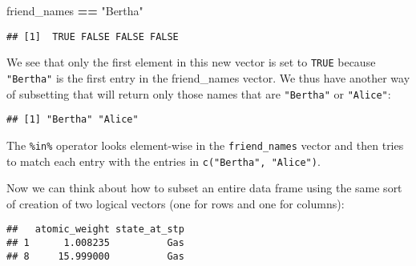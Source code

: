\documentclass[]{tufte-book}
\newenvironment{Shaded}{\begin{snugshade}}{\end{snugshade}}
\newcommand{\KeywordTok}[1]{\textcolor[rgb]{0.13,0.29,0.53}{\textbf{#1}}}
\newcommand{\NormalTok}[1]{#1}
\newcommand{\OperatorTok}[1]{\textcolor[rgb]{0.81,0.36,0.00}{\textbf{#1}}}
\newcommand{\StringTok}[1]{\textcolor[rgb]{0.31,0.60,0.02}{#1}}
\begin{document}
\begin{Shaded}
\begin{Highlighting}[]
\NormalTok{friend_names }\OperatorTok{==}\StringTok{ "Bertha"}
\end{Highlighting}
\end{Shaded}

\begin{verbatim}
## [1]  TRUE FALSE FALSE FALSE
\end{verbatim}

We see that only the first element in this new vector is set to \texttt{TRUE} because \texttt{"Bertha"} is the first entry in the friend\_names vector. We thus have another way of subsetting that will return only those names that are \texttt{"Bertha"} or \texttt{"Alice"}:

\begin{Shaded}
\end{Shaded}

\begin{verbatim}
## [1] "Bertha" "Alice"
\end{verbatim}

The \texttt{\%in\%} operator looks element-wise in the \texttt{friend\_names} vector and then tries to match each entry with the entries in \texttt{c("Bertha",\ "Alice")}.

Now we can think about how to subset an entire data frame using the same sort of creation of two logical vectors (one for rows and one for columns):

\begin{Shaded}
\end{Shaded}

\begin{verbatim}
##   atomic_weight state_at_stp
## 1      1.008235          Gas
## 8     15.999000          Gas
\end{verbatim}
\end{document}
